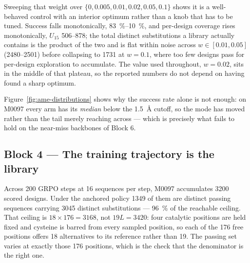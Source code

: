 Sweeping that weight over $\{0, 0.005, 0.01, 0.02, 0.05, 0.1\}$ shows it is a
well-behaved control with an interior optimum rather than a knob that has to be
tuned. Success falls monotonically, \SIrange{83}{10}{\percent}, and per-design
coverage rises monotonically, $U_{15}$ \numrange{506}{878}; the total distinct
substitutions a library actually contains is the product of the two and is flat
within noise across $w \in [0.01, 0.05]$ (\numrange{2480}{2501}) before
collapsing to \num{1731} at $w = 0.1$, where too few designs pass for
per-design exploration to accumulate. The value used throughout,
$w = \num{0.02}$, sits in the middle of that plateau, so the reported numbers do
not depend on having found a sharp optimum.



Figure~\ref{fig:ame-distributions} shows why the success rate alone is not
enough: on M0097 every \cleo{} arm has its \emph{median} below the
\SI{1.5}{\angstrom} cutoff, so the mode has moved rather than the tail merely
reaching across --- which is precisely what fails to hold on the near-miss
backbones of Block 6.

\subsection*{Block 4 --- The training trajectory is the library}


Across 200 GRPO steps at 16 sequences per step, M0097 accumulates 3200 scored
designs. Under the anchored policy \num{1349} of them are distinct passing
sequences carrying \num{3045} distinct substitutions --- \SI{96}{\percent} of
the reachable ceiling. That ceiling is $18 \times 176 = 3168$, not $19L = 3420$:
four catalytic positions are held fixed and cysteine is barred from every
sampled position, so each of the 176 free positions offers 18 alternatives to
its reference rather than 19. The passing set varies at exactly those 176
positions, which is the check that the denominator is the right one.

